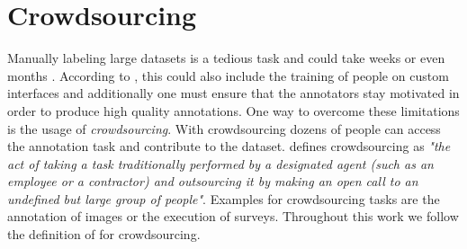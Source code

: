\section{Crowdsourcing}
\label{chp:fundamentals:sec:crowdsourcing}
Manually labeling large datasets is a tedious task and could take weeks or even months \parencite{Welinder:2010}.
According to \textcite{Welinder:2010}, this could also include the training of people on custom interfaces and additionally one must ensure that the annotators stay motivated in order to produce high quality annotations.
One way to overcome these limitations is the usage of \textit{crowdsourcing}.
With crowdsourcing dozens of people can access the annotation task and contribute to the dataset.
\textcite{Howe:2008} defines crowdsourcing as \textit{"the act of taking a task traditionally performed by a designated agent (such as an employee or a contractor) and outsourcing it by making an open call to an undefined but large group of people"}.
Examples for crowdsourcing tasks are the annotation of images or the execution of surveys.
Throughout this work we follow the definition of \textcite{Howe:2008} for crowdsourcing.
